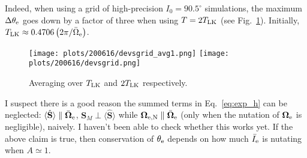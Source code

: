\documentclass[11pt,
        usenames, %
        dvipsnames %
    ]{article}
\newcommand*{\bm}[1]{\boldsymbol{\mathbf{#1}}}
\newcommand*{\uv}[1]{\hat{\bm{#1}}}
\newcommand*{\ev}[1]{\langle#1\rangle}
\newcommand*{\p}[1]{\left(#1\right)}
\begin{document}
Indeed, when using a grid of high-precision $I_0 = 90.5^\circ$ simulations,
the maximum $\Delta \theta_{\rm e}$ goes down by a factor of three when using $T
= 2T_{\rm LK}$ (see Fig.~\ref{fig:devsgrid}). Initially, $T_{\rm LK} \approx
0.4706\p{2\pi / \bar{\Omega}_{\rm e}}$.
\begin{figure}
    \centering
    \texttt{[image: plots/200616/devsgrid\_avg1.png]}
    \texttt{[image: plots/200616/devsgrid.png]}
    \caption{Averaging over $T_{\rm LK}$ and $2T_{\rm LK}$
    respectively.}\label{fig:devsgrid}
\end{figure}

I suspect there is a good reason the summed terms in Eq.~\eqref{eq:exp_h} can be
neglected: $\ev{\uv{S}} \parallel \bar{\bm{\Omega}}_{\rm e}$, $\bm{S}_{M} \perp
\ev{\uv{S}}$ while $\bm{\Omega}_{\rm e, N} \parallel \bar{\bm{\Omega}}_{\rm e}$
(only when the nutation of $\bm{\Omega}_{\rm e}$ is negligible), naively. I
haven't been able to check whether this works yet. If the above claim is true,
then conservation of $\theta_{\rm e}$ depends on how much $\bar{I}_{\rm e}$ is
nutating when $A \simeq 1$.
\end{document}
